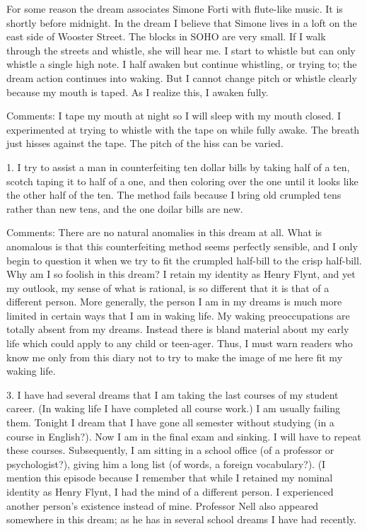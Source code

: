 \documentclass[10pt,twoside,draft]{memoir}
\begin{document}
{{

For some reason the dream associates Simone Forti with flute-like 
music. It is shortly before midnight. In the dream I believe that Simone lives 
in a loft on the east side of Wooster Street. The blocks in SOHO are very 
small. If I walk through the streets and whistle, she will hear me. I start to 
whistle but can only whistle a single high note. I half awaken but continue 
whistling, or trying to; the dream action continues into waking. But I cannot 
change pitch or whistle clearly because my mouth is taped. As I realize this, I 
awaken fully. 

Comments: I tape my mouth at night so I will sleep with my mouth closed. I 
experimented at trying to whistle with the tape on while fully awake. The 
breath just hisses against the tape. The pitch of the hiss can be varied. 



1. I try to assist a man in counterfeiting ten dollar bills by taking half 
of a ten, scotch taping it to half of a one, and then coloring over the one 
until it looks like the other half of the ten. The method fails because I bring 
old crumpled tens rather than new tens, and the one doilar bills are new. 


Comments: There are no natural anomalies in this dream at all. What is 
anomalous is that this counterfeiting method seems perfectly sensible, and I 
only begin to question it when we try to fit the crumpled half-bill to the 
crisp half-bill. Why am I so foolish in this dream? I retain my identity as 
Henry Flynt, and yet my outlook, my sense of what is rational, is so 
different that it is that of a different person. More generally, the person I am 
in my dreams is much more limited in certain ways that I am in waking life. 
My waking preoccupations are totally absent from my dreams. Instead there 
is bland material about my early life which could apply to any child or 
teen-ager. Thus, I must warn readers who know me only from this diary not 
to try to make the image of me here fit my waking life. 



3. I have had several dreams that I am taking the last courses of my 
student career. (In waking life I have completed all course work.) I am 
usually failing them. Tonight I dream that I have gone all semester without 
studying (in a course in English?). Now I am in the final exam and sinking. I 
will have to repeat these courses. Subsequently, I am sitting in a school 
office (of a professor or psychologist?), giving him a long list (of words, a 
foreign vocabulary?). (I mention this episode because I remember that while 
I retained my nominal identity as Henry Flynt, I had the mind of a different 
person. I experienced another person's existence instead of mine. Professor 
Nell also appeared somewhere in this dream; as he has in several school 
dreams I have had recently. 


}}
\end{document}
